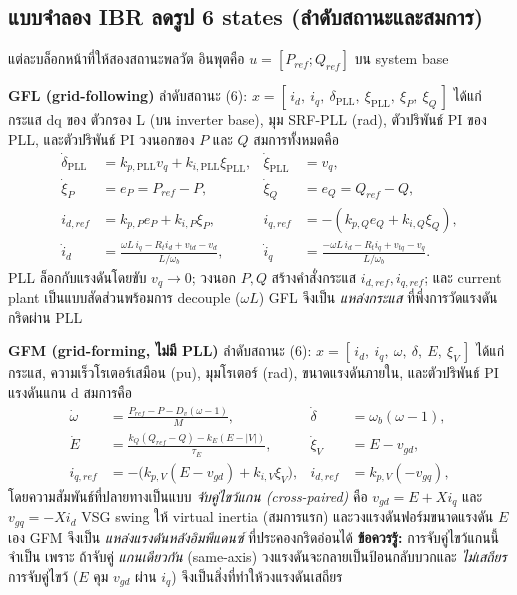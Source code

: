 \documentclass[12pt,a4paper]{article}
\begin{document}
\subsection{แบบจำลอง IBR ลดรูป 6 states (ลำดับสถานะและสมการ)}
แต่ละบล็อกหน้าที่ให้สองสถานะพลวัต อินพุตคือ $u=[P_{ref};Q_{ref}]$ บน system base

\textbf{GFL (grid-following)} ลำดับสถานะ (6):
$x=[\,i_d,\ i_q,\ \delta_{\mathrm{PLL}},\ \xi_{\mathrm{PLL}},\ \xi_P,\ \xi_Q\,]$ ได้แก่ กระแส dq ของ
ตัวกรอง L (บน inverter base), มุม SRF-PLL (rad), ตัวปริพันธ์ PI ของ PLL, และตัวปริพันธ์ PI วงนอกของ $P$
และ $Q$ สมการทั้งหมดคือ
\begin{align}
\dot{\delta}_{\mathrm{PLL}} &= k_{p,\mathrm{PLL}}v_q + k_{i,\mathrm{PLL}}\xi_{\mathrm{PLL}}, &
\dot{\xi}_{\mathrm{PLL}} &= v_q,\\
\dot{\xi}_P &= e_P = P_{ref}-P, & \dot{\xi}_Q &= e_Q = Q_{ref}-Q,\\
i_{d,ref} &= k_{p,P}e_P + k_{i,P}\xi_P, & i_{q,ref} &= -(k_{p,Q}e_Q + k_{i,Q}\xi_Q),\\
\dot{i}_d &= \frac{\omega L\, i_q - R_t i_d + v_{td} - v_d}{L/\omega_b}, &
\dot{i}_q &= \frac{-\omega L\, i_d - R_t i_q + v_{tq} - v_q}{L/\omega_b}.
\end{align}
PLL ล็อกกับแรงดันโดยขับ $v_q\to0$; วงนอก $P,Q$ สร้างคำสั่งกระแส $i_{d,ref},i_{q,ref}$; และ current plant
เป็นแบบสัดส่วนพร้อมการ decouple ($\omega L$) GFL จึงเป็น \emph{แหล่งกระแส} ที่พึ่งการวัดแรงดันกริดผ่าน PLL

\textbf{GFM (grid-forming, ไม่มี PLL)} ลำดับสถานะ (6):
$x=[\,i_d,\ i_q,\ \omega,\ \delta,\ E,\ \xi_V\,]$ ได้แก่ กระแส, ความเร็วโรเตอร์เสมือน (pu), มุมโรเตอร์ (rad),
ขนาดแรงดันภายใน, และตัวปริพันธ์ PI แรงดันแกน d สมการคือ
\begin{align}
\dot{\omega} &= \frac{P_{ref}-P-D_v(\omega-1)}{M}, & \dot{\delta} &= \omega_b(\omega-1),\\
\dot{E} &= \frac{k_Q(Q_{ref}-Q)-k_E(E-|V|)}{\tau_E}, & \dot{\xi}_V &= E - v_{gd},\\
i_{q,ref} &= -\big(k_{p,V}(E-v_{gd})+k_{i,V}\xi_V\big), & i_{d,ref} &= k_{p,V}(-v_{gq}),
\end{align}
โดยความสัมพันธ์ที่ปลายทางเป็นแบบ \emph{จับคู่ไขว้แกน (cross-paired)} คือ $v_{gd}=E+X i_q$ และ
$v_{gq}=-X i_d$ VSG swing ให้ virtual inertia (สมการแรก) และวงแรงดันฟอร์มขนาดแรงดัน $E$ เอง GFM จึงเป็น
\emph{แหล่งแรงดันหลังอิมพีแดนซ์} ที่ประคองกริดอ่อนได้ \textbf{ข้อควรรู้:} การจับคู่ไขว้แกนนี้จำเป็น เพราะ
ถ้าจับคู่ \emph{แกนเดียวกัน} (same-axis) วงแรงดันจะกลายเป็นป้อนกลับบวกและ \emph{ไม่เสถียร} การจับคู่ไขว้
($E$ คุม $v_{gd}$ ผ่าน $i_q$) จึงเป็นสิ่งที่ทำให้วงแรงดันเสถียร
\end{document}
